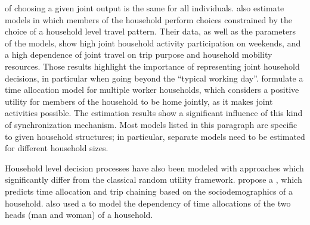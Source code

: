 {of choosing a given joint output is the same for all individuals.
%
 also estimate models in which members of the household
perform choices constrained by the choice of a household level travel pattern.
Their data, as well as the parameters of the models,
show high joint household activity participation on weekends,
and a high dependence of joint travel on trip purpose and household
mobility resources.
Those results highlight the importance of representing joint household decisions,
in particular when going beyond the ``typical working day''.
%
 formulate a time allocation model for multiple worker households,
which considers a positive utility for members of the household
to be home jointly, as it makes joint activities possible.
The estimation results show a significant influence of this kind of synchronization mechanism.
%
Most models listed in this paragraph
are specific to given household structures;
in particular, separate models need to be estimated for different household sizes.

Household level decision processes have also been modeled with approaches which significantly differ
from the classical random utility framework.
%
propose a \structeqmodel,
which predicts time allocation and trip chaining based on the sociodemographics of a household.
also used a \structeqmodel to model the dependency of time allocations
of the two heads (man and woman) of a household.
%

}
